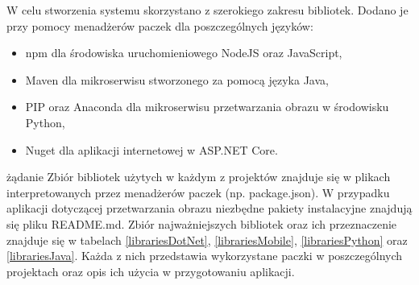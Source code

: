 W celu stworzenia systemu skorzystano z szerokiego zakresu bibliotek. Dodano je przy pomocy menadżerów paczek dla poszczególnych języków:
\begin{itemize}[noitemsep]
	\item npm dla środowiska uruchomieniowego NodeJS oraz JavaScript,
	\item Maven dla mikroserwisu stworzonego za pomocą języka Java,
	\item PIP oraz Anaconda dla mikroserwisu przetwarzania obrazu w środowisku Python,
	\item Nuget dla aplikacji internetowej w ASP.NET Core.
\end{itemize}
żądanie 
Zbiór bibliotek użytych w każdym z projektów znajduje się w plikach interpretowanych przez menadżerów paczek (np. package.json). W przypadku aplikacji dotyczącej przetwarzania obrazu niezbędne pakiety instalacyjne znajdują się pliku README.md. Zbiór najważniejszych bibliotek oraz ich przeznaczenie znajduje się w tabelach \ref{librariesDotNet}, \ref{librariesMobile}, \ref{librariesPython} oraz \ref{librariesJava}. Każda z nich przedstawia wykorzystane paczki w poszczególnych projektach oraz opis ich użycia w przygotowaniu aplikacji.

